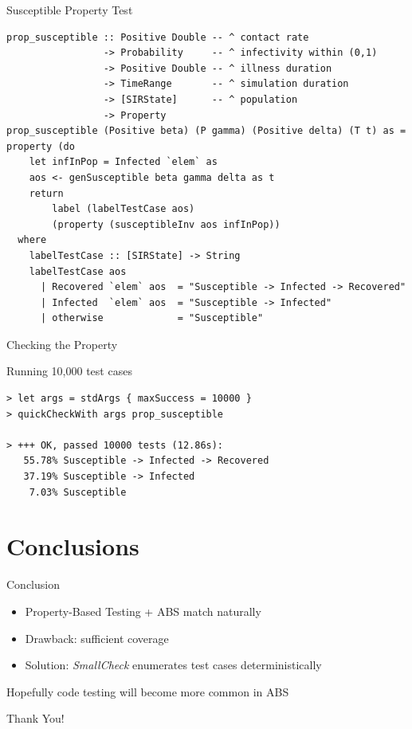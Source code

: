 \documentclass{beamer} %
\begin{document}
\begin{frame}[fragile]{Susceptible Property Test}
\begin{verbatim}
prop_susceptible :: Positive Double -- ^ contact rate
                 -> Probability     -- ^ infectivity within (0,1)
                 -> Positive Double -- ^ illness duration
                 -> TimeRange       -- ^ simulation duration
                 -> [SIRState]      -- ^ population
                 -> Property
prop_susceptible (Positive beta) (P gamma) (Positive delta) (T t) as = property (do  
    let infInPop = Infected `elem` as
    aos <- genSusceptible beta gamma delta as t
    return 
        label (labelTestCase aos) 
        (property (susceptibleInv aos infInPop))
  where
    labelTestCase :: [SIRState] -> String
    labelTestCase aos
      | Recovered `elem` aos  = "Susceptible -> Infected -> Recovered"
      | Infected  `elem` aos  = "Susceptible -> Infected"
      | otherwise             = "Susceptible"
\end{verbatim}
\end{frame}

\begin{frame}[fragile]{Checking the Property}
\begin{block}{Running 10,000 test cases}
\begin{footnotesize}
\begin{verbatim}
> let args = stdArgs { maxSuccess = 10000 }
> quickCheckWith args prop_susceptible

> +++ OK, passed 10000 tests (12.86s):
   55.78% Susceptible -> Infected -> Recovered
   37.19% Susceptible -> Infected
    7.03% Susceptible
\end{verbatim}
\end{footnotesize}
\end{block}
\end{frame}

\section{Conclusions}
\begin{frame}{Conclusion}
	\begin{itemize}
		\item Property-Based Testing + ABS match naturally
		\item Drawback: sufficient coverage
		\item Solution: \textit{SmallCheck} enumerates test cases deterministically
	\end{itemize}
	
\begin{block}{}
Hopefully code testing will become more common in ABS
\end{block}
\end{frame}

\begin{frame}{}
  \begin{center}
  Thank You!
  \end{center}
\end{frame}



\end{document}
